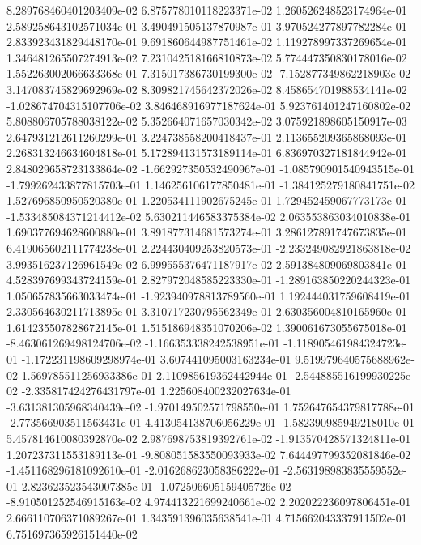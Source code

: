 8.289768460401203409e-02	6.875778010118223371e-02	1.260526248523174964e-01	2.589258643102571034e-01	3.490491505137870987e-01	3.970524277897782284e-01	2.833923431829448170e-01	9.691860644987751461e-02	1.119278997337269654e-01	1.346481265507274913e-02	7.231042518166810873e-02	5.774447350830178016e-02	1.552263002066633368e-01	7.315017386730199300e-02	-7.152877349862218903e-02	3.147083745829692969e-02	8.309821745642372026e-02	8.458654701988534141e-02	-1.028674704315107706e-02	3.846468916977187624e-01	5.923761401247160802e-02	5.808806705788038122e-02	5.352664071657030342e-02	3.075921898605150917e-03	2.647931212611260299e-01	3.224738558200418437e-01	2.113655209365868093e-01	2.268313246634604818e-01	5.172894131573189114e-01	6.836970327181844942e-01	2.848029658723133864e-02	-1.662927350532490967e-01	-1.085790901540943515e-01	-1.799262433877815703e-01	1.146256106177850481e-01	-1.384125279180841751e-02	1.527696850950520380e-01	1.220534111902675245e-01	1.729452459067773173e-01	-1.533485084371214412e-02	5.630211446583375384e-02	2.063553863034010838e-01	1.690377694628600880e-01	3.891877314681573274e-01	3.286127891747673835e-01	6.419065602111774238e-01	2.224430409253820573e-01	-2.233249082921863818e-02	3.993516237126961549e-02	6.999555376471187917e-02	2.591384809069803841e-01	4.528397699343724159e-01	2.827972048585223330e-01	-1.289163850220244323e-01	1.050657835663033474e-01	-1.923940978813789560e-01	1.192444031759608419e-01	2.330564630211713895e-01	3.310717230795562349e-01	2.630356004810165960e-01	1.614235507828672145e-01	1.515186948351070206e-02	1.390061673055675018e-01	-8.463061269498124706e-02	-1.166353338242538951e-01	-1.118905461984324723e-01	-1.172231198609298974e-01	3.607441095003163234e-01	9.519979640575688962e-02	1.569785511256933386e-01	2.110985619362442944e-01	-2.544885516199930225e-02	-2.335817424276431797e-01	1.225608400232027634e-01	-3.631381305968340439e-02	-1.970149502571798550e-01	1.752647654379817788e-01	-2.773566903511563431e-01	4.413054138706056229e-01	-1.582390985949218010e-01	5.457814610080392870e-02	2.987698753819392761e-02	-1.913570428571324811e-01	1.207237311553189113e-01	-9.808051583550093933e-02	7.644497799352081846e-02	-1.451168296181092610e-01	-2.016268623058386222e-01	-2.563198983835559552e-01	2.823623523543007385e-01	-1.072506605159405726e-02	-8.910501252546915163e-02	4.974413221699240661e-02	2.202022236097806451e-01	2.666110706371089267e-01	1.343591396035638541e-01	4.715662043337911502e-01	6.751697365926151440e-02
